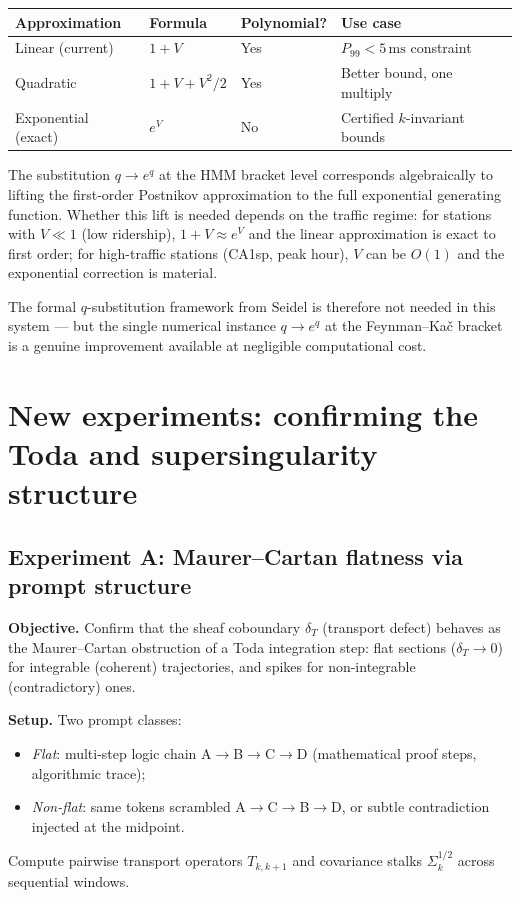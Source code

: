 \documentclass[11pt]{amsart}
\theoremstyle{definition}
\begin{document}
\begin{center}
\renewcommand{\arraystretch}{1.2}
\begin{tabular}{@{}llll@{}}
\toprule
Approximation & Formula & Polynomial? & Use case \\
\midrule
Linear (current) & $1 + V$ & Yes & $P_{99} < 5\,\mathrm{ms}$ constraint \\
Quadratic & $1 + V + V^2/2$ & Yes & Better bound, one multiply \\
Exponential (exact) & $e^V$ & No & Certified $k$-invariant bounds \\
\bottomrule
\end{tabular}
\end{center}

The substitution $q \to e^q$ at the HMM bracket level corresponds
algebraically to lifting the first-order Postnikov approximation
to the full exponential generating function.
Whether this lift is needed depends on the traffic regime:
for stations with $V \ll 1$ (low ridership), $1 + V \approx e^V$
and the linear approximation is exact to first order;
for high-traffic stations (CA1sp, peak hour), $V$ can be $O(1)$
and the exponential correction is material.

The formal $q$-substitution framework from Seidel is therefore not
needed in this system --- but the single numerical instance
$q \to e^q$ at the Feynman--Ka\v{c} bracket is a genuine
improvement available at negligible computational cost.

\section{New experiments: confirming the Toda and supersingularity structure}
\label{sec:new-experiments}

\subsection{Experiment A: Maurer--Cartan flatness via prompt structure}

\textbf{Objective.}
Confirm that the sheaf coboundary $\delta_T$ (transport defect) behaves
as the Maurer--Cartan obstruction of a Toda integration step:
flat sections ($\delta_T \to 0$) for integrable (coherent) trajectories,
and spikes for non-integrable (contradictory) ones.

\textbf{Setup.}
Two prompt classes:
\begin{itemize}
  \item \emph{Flat}: multi-step logic chain A$\to$B$\to$C$\to$D
    (mathematical proof steps, algorithmic trace);
  \item \emph{Non-flat}: same tokens scrambled A$\to$C$\to$B$\to$D,
    or subtle contradiction injected at the midpoint.
\end{itemize}
Compute pairwise transport operators $T_{k,k+1}$ and covariance stalks
$\Sigma_k^{1/2}$ across sequential windows.
\end{document}

